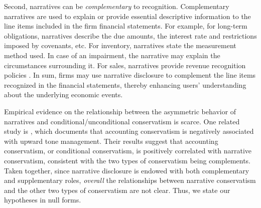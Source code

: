 \documentclass[letterpaper,12pt]{article}
\begin{document}
\begin{spacing}{1.5}
Second, narratives can be \textit{complementary} to recognition. Complementary narratives are used to explain or provide essential descriptive information to the line items included in the firm financial statements. For example, for long-term obligations, narratives describe the due amounts, the interest rate and restrictions imposed by covenants, etc. For inventory, narratives state the measurement method used. In case of an impairment, the narrative may explain the circumstances surrounding it. For sales, narratives provide revenue recognition policies \cite[footnote 4, CON5-7]{fasbStatementFinancialAccounting1984}. In sum, firms may use narrative disclosure to complement the line items recognized in the financial statements, thereby enhancing users' understanding about the underlying economic events.

\begin{comment}
\citeA[footnote 4, CON5-7]{fasbStatementFinancialAccounting1984} gives several examples on the complementary role of notes to financial statements:

\begin{adjustwidth}{1cm}{1cm}
\begin{singlespace}
\indent \textit{For example, notes provide essential descriptive information for long-term obligations, including when amounts are due, what interest they bear, and whether important restrictions are imposed by related covenants. For inventory, the notes provide information on the measurement method used---FIFO cost, LIFO cost, current market value, etc. For an estimated litigation liability, an extended discussion of the circumstances, counsel's opinions, and the basis for management's judgment may all be provided in the notes. For sales, useful information about revenue recognition policies may appear only in the notes (FASB Statement No. 47, Disclosure of Long-Term Obligations; ARB No. 43, Chapter 4, ``Inventory Pricing", statement 8; FASB Statement No. 5, Accounting for Contingencies, par. 10; and APB Statement 4, par. 199)}.
\end{singlespace}
\end{adjustwidth}
\end{comment}

Empirical evidence on the relationship between the asymmetric behavior of narratives and conditional/unconditional conservatism is scarce. One related study is , which documents that accounting conservatism is negatively associated with upward tone management. Their results suggest that accounting conservatism, or conditional conservatism, is positively correlated with narrative conservatism, consistent with the two types of conservatism being complements. Taken together, since narrative disclosure is endowed with both complementary and supplementary roles, \textit{overall} the relationships between narrative conservatism and the other two types of conservatism are not clear. Thus, we state our hypotheses in null forms.


\end{spacing}
\end{document}
